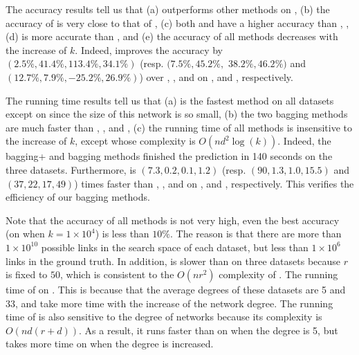 The accuracy results tell us that (a) \Biased outperforms other methods on
, (b) the accuracy of \Biasedp is very close to that of \Biased, (c) both
\Biased and \Biasedp have a higher accuracy than \Aa, ,
(d) \NMF is more accurate than ,
and (e) the accuracy of all methods decreases with the increase of $k$.
Indeed, \Biased improves the accuracy by $(2.5\%, 41.4\%, 113.4\%, 34.1\%)$ (resp. $(7.5\%, 45.2\%,$ $ 38.2\%, 46.2\%)$
and $(12.7\%, 7.9\%, -25.2\%, 26.9\%)$) over \NMF, \Aa, \RA and \BIGCLAM on \Digg, \YouTube and \Wikipedia,
respectively. 


The running time results tell us that (a) \Biasedp is the fastest method on all
datasets except \Aa {} on \Digg since the size of this network is so
small, (b) the two bagging methods are much faster than \NMF, \Aa, \marked{\RA} and \BIGCLAM,
(c) the running time of all methods is insensitive to the increase of $k$,
except \Aa {} whose complexity is $O(nd^2\log(k))$.
Indeed, the bagging+ and bagging methods finished the prediction in 140 seconds on the three datasets.
Furthermore, \Biasedp is $(7.3, 0.2, 0.1, 1.2)$ (resp. $(90, 1.3, 1.0, 15.5)$ and $(37, 22, 17, 49)$)
times faster than \NMF, \Aa, \marked{\RA} and \BIGCLAM on
\Digg, \YouTube and \Wikipedia, respectively.
This verifies the efficiency of our bagging methods.


Note that the accuracy of all methods is not very high, even the best
accuracy (\Biasedp on \Digg when $k = 1\times 10^4$) is less than $10\%$. The reason is that
there are more than $1\times 10^{10}$ possible links in the search space of each dataset,
but less than $1\times 10^6$ links in the ground truth.
In addition, \NMF is slower than  on three datasets because $r$ is fixed to $50$,
which is consistent to the $O(nr^2)$ complexity of \NMF.
The running time of  on \Wikipedia.
This is because that the average degrees of these datasets are 5 and 33,
and \Aa  {} take more time with the increase of the network degree.
The running time of \BIGCLAM is also sensitive to the degree of
networks because its complexity is $O(nd(r + d))$.
As a result, it runs faster than
\NMF on \YouTube when the degree is 5, but takes more time on \Wikipedia
when the degree is increased.








